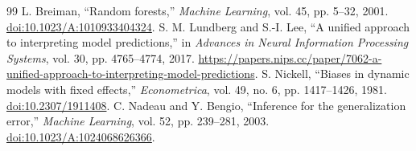 \begin{thebibliography}{99}
 L. Breiman, ``Random forests,'' \textit{Machine Learning}, vol. 45, pp. 5--32, 2001. \href{https://doi.org/10.1023/A:1010933404324}{doi:10.1023/A:1010933404324}.
 S. M. Lundberg and S.-I. Lee, ``A unified approach to interpreting model predictions,'' in \textit{Advances in Neural Information Processing Systems}, vol. 30, pp. 4765--4774, 2017. \url{https://papers.nips.cc/paper/7062-a-unified-approach-to-interpreting-model-predictions}.
 S. Nickell, ``Biases in dynamic models with fixed effects,'' \textit{Econometrica}, vol. 49, no. 6, pp. 1417--1426, 1981. \href{https://doi.org/10.2307/1911408}{doi:10.2307/1911408}.
 C. Nadeau and Y. Bengio, ``Inference for the generalization error,'' \textit{Machine Learning}, vol. 52, pp. 239--281, 2003. \href{https://doi.org/10.1023/A:1024068626366}{doi:10.1023/A:1024068626366}.
\end{thebibliography}

